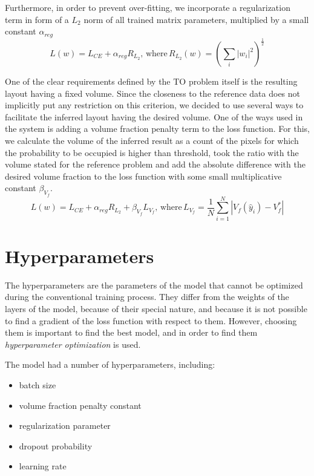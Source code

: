 Furthermore, in order to prevent over-fitting, we incorporate a regularization term in form of a $L_{2}$ norm of all trained matrix parameters, multiplied by a small constant $\alpha_{reg}$
\begin{equation}
 	L(w) = L_{CE} + \alpha_{reg} R_{L_{2}}, \, \mathrm{where} \, R_{L_{2}}(w) = ( \sum_{i}^{} |w_{i}|^{2} )^{\frac{1}{2}} 
\end{equation}
\medskip

One of the clear requirements defined by the TO problem itself is the resulting layout having a fixed volume. 
Since the closeness to the reference data does not implicitly put any restriction on this criterion, we decided to use several ways to facilitate the inferred layout having the desired volume.
One of the ways used in the system is adding a volume fraction penalty term to the loss function.
For this, we calculate the volume of the inferred result as a count of the pixels for which the probability to be occupied is higher than threshold, took the ratio with the volume stated for the reference problem and add the absolute difference with the desired volume fraction to the loss function with some small multiplicative constant $\beta_{V_{f}}$.
\begin{equation}
	L(w) = L_{CE} + \alpha_{reg} R_{L_{2}} + \beta_{V_{f}}  L_{V_{f}} , \, \mathrm{where} \, L_{V_{f}} = \frac{1}{N} \sum_{i=1}^{N} |V_{f}(\hat{y}_{i}) - V_{f}^{\ast}|
\end{equation}


\section{Hyperparameters}

The hyperparameters are the parameters of the model that cannot be optimized during the conventional training process.
They differ from the weights of the layers of the model, because of their special nature, and because it is not possible to find a gradient of the loss function with respect to them.
However, choosing them is important to find the best model, and in order to find them \emph{hyperparameter optimization} is used.
\medskip

The model had a number of hyperparameters, including:
\begin{itemize}
	\item batch size
	\item volume fraction penalty constant
	\item regularization parameter
	\item dropout probability 
	\item learning rate
\end{itemize}

